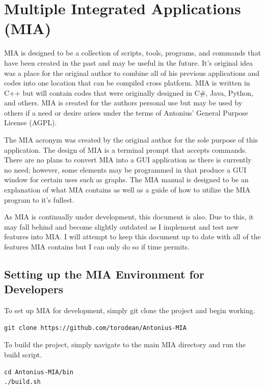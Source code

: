 \chapter{Multiple Integrated Applications (MIA)}
\pagestyle{fancy}

MIA is designed to be a collection of scripts, tools, programs, and commands that have been created in the past and may be useful in the future. It's original idea was a place for the original author to combine all of his previous applications and codes into one location that can be compiled cross platform. MIA is written in C++ but will contain codes that were originally designed in C\#, Java, Python, and others. MIA is created for the authors personal use but may be used by others if a need or desire arises under the terms of Antonius’ General Purpose License (AGPL). 

The MIA acronym was created by the original author for the sole purpose of this application. The design of MIA is a terminal prompt that accepts commands. There are no plans to convert MIA into a GUI application as there is currently no need; however, some elements may be programmed in that produce a GUI window for certain uses such as graphs. The MIA manual is designed to be an explanation of what MIA contains as well as a guide of how to utilize the MIA program to it's fullest. 

As MIA is continually under development, this document is also. Due to this, it may fall behind and become slightly outdated as I implement and test new features into MIA. I will attempt to keep this document up to date with all of the features MIA contains but I can only do so if time permits.

\section{Setting up the MIA Environment for Developers}

To set up MIA for development, simply git clone the project and begin working.

\begin{lstlisting}
git clone https://github.com/torodean/Antonius-MIA
\end{lstlisting}

To build the project, simply navigate to the main MIA directory and run the build script.

\begin{lstlisting}
cd Antonius-MIA/bin
./build.sh
\end{lstlisting}

